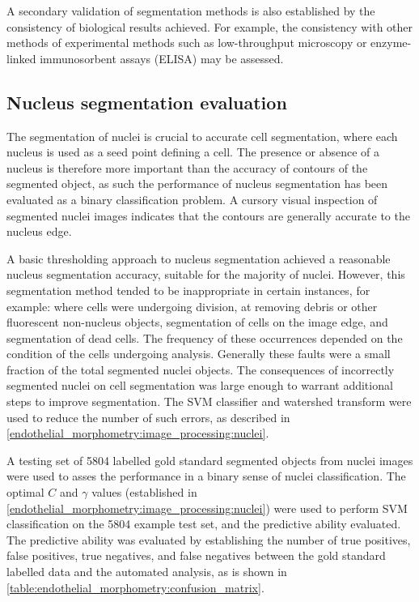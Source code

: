 A secondary validation of segmentation methods is also established by the consistency of biological results achieved. For example, the consistency with other methods of experimental methods such as low-throughput microscopy or enzyme-linked immunosorbent assays (ELISA) may be assessed.

\subsection{Nucleus segmentation evaluation}
\label{endothelial_morphometry:performance_evaluation:nucleus}
The segmentation of nuclei is crucial to accurate cell segmentation, where each nucleus is used as a seed point defining a cell. The presence or absence of a nucleus is therefore more important than the accuracy of contours of the segmented object, as such the performance of nucleus segmentation has been evaluated as a binary classification problem. A cursory visual inspection of segmented nuclei images indicates that the contours are generally accurate to the nucleus edge.

A basic thresholding approach to nucleus segmentation achieved a reasonable nucleus segmentation accuracy, suitable for the majority of nuclei. However, this segmentation method tended to be inappropriate in certain instances, for example: where cells were undergoing division, at removing debris or other fluorescent non-nucleus objects, segmentation of cells on the image edge, and segmentation of dead cells. The frequency of these occurrences depended on the condition of the cells undergoing analysis. Generally these faults were a small fraction of the total segmented nuclei objects. The consequences of incorrectly segmented nuclei on cell segmentation was large enough to warrant additional steps to improve segmentation. The SVM classifier and watershed transform were used to reduce the number of such errors, as described in \autoref{endothelial_morphometry:image_processing:nuclei}.

A testing set of 5804 labelled gold standard segmented objects from nuclei images were used to asses the performance in a binary sense of nuclei classification. The optimal $C$ and $\gamma$ values (established in \autoref{endothelial_morphometry:image_processing:nuclei}) were used to perform SVM classification on the 5804 example test set, and the predictive ability evaluated. The predictive ability was evaluated by establishing the number of true positives, false positives, true negatives, and false negatives between the gold standard labelled data and the automated analysis, as is shown in \autoref{table:endothelial_morphometry:confusion_matrix}.

